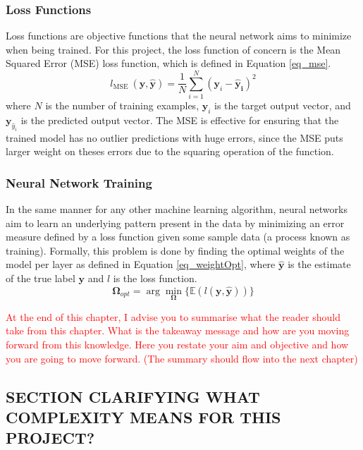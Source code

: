  \subsubsection{Loss Functions}
 Loss functions are objective functions that the neural network aims to minimize when being
trained. For this project, the loss function of concern is the Mean Squared Error (MSE) loss function, which is defined in 
Equation \ref{eq_mse}.
\begin{equation}\label{eq_mse}
    l_\text{MSE }(\mathbf{y}, \mathbf{\hat{y}}) = \frac{1}{N} \sum_{i=1}^N (\mathbf{y}_i - \mathbf{\hat{y}_i})^2
\end{equation}\noindent where $N$ is the number of training examples, $\mathbf{y}_i$ is the target output vector, and $\mathbf{y}_{\hat{y}_i}$ is the predicted output vector.
The MSE is effective for ensuring that the trained model has no outlier predictions 
with huge errors, since the MSE puts larger weight on theses errors due to the squaring 
operation of the function.

 \subsubsection{Neural Network Training}
 In the same manner for any other machine learning algorithm, neural networks aim to learn an underlying pattern
 present in the data by minimizing an error measure defined by a loss function given some
 sample data (a process known as training). Formally, this problem is done by finding the
 optimal weights of the model per layer as defined in Equation \ref{eq_weightOpt}, where $\mathbf{\hat{y}}$ is the estimate of
 the true label $\mathbf{y}$ and $l$ is the loss function.
 \begin{equation}\label{eq_weightOpt}
    \mathbf{\Omega}_{opt} = \arg \min_{\mathbf{\Omega}} \{\mathbb{E}(l(\mathbf{y}, \mathbf{\hat{y}}))\}
 \end{equation}

\textcolor{red}{At the end of this chapter, I advise you to summarise what the reader should take from this chapter. What is the takeaway message and how are you moving forward from this knowledge. Here you restate your aim and objective and how you are going to move forward.}
\textcolor{red}{(The summary should flow into the next chapter)}

\subsection{SECTION CLARIFYING WHAT COMPLEXITY MEANS FOR THIS PROJECT?}

